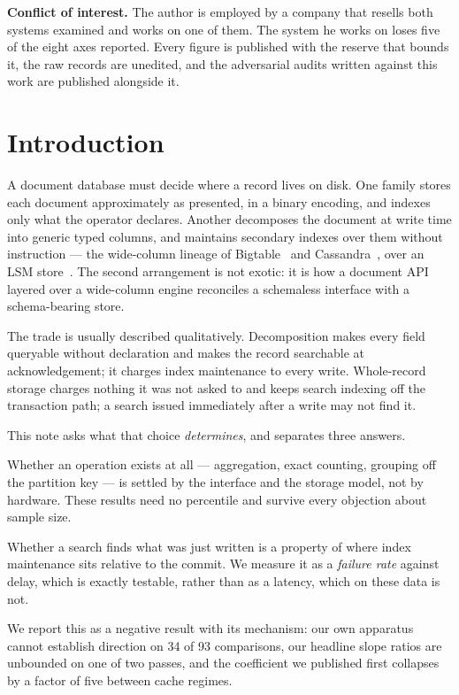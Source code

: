 \documentclass[11pt,a4paper]{article}
\begin{document}
\vspace{0.5em}
\noindent\textbf{Conflict of interest.} The author is employed by a company that resells both
systems examined and works on one of them. The system he works on loses five of the eight axes
reported. Every figure is published with the reserve that bounds it, the raw records are unedited,
and the adversarial audits written against this work are published alongside it.

\section{Introduction}

A document database must decide where a record lives on disk. One family stores each document
approximately as presented, in a binary encoding, and indexes only what the operator declares.
Another decomposes the document at write time into generic typed columns, and maintains secondary
indexes over them without instruction --- the wide-column lineage of Bigtable~\cite{chang2008bigtable}
and Cassandra~\cite{lakshman2010cassandra}, over an LSM store~\cite{oneil1996lsm,luo2019lsmsurvey}. The second arrangement is not exotic: it is how a document
API layered over a wide-column engine reconciles a schemaless interface with a schema-bearing store.

The trade is usually described qualitatively. Decomposition makes every field queryable without
declaration and makes the record searchable at acknowledgement; it charges index maintenance to
every write. Whole-record storage charges nothing it was not asked to and keeps search indexing off
the transaction path; a search issued immediately after a write may not find it.

This note asks what that choice \emph{determines}, and separates three answers.

\begin{description}[style=nextline]
\item[It determines capability.] Whether an operation exists at all --- aggregation, exact
counting, grouping off the partition key --- is settled by the interface and the storage model, not
by hardware. These results need no percentile and survive every objection about sample size.

\item[It determines index currency.] Whether a search finds what was just written is a property of
where index maintenance sits relative to the commit. We measure it as a \emph{failure rate} against
delay, which is exactly testable, rather than as a latency, which on these data is not.

\item[It does not determine latency, on evidence we can offer.] We report this as a negative
result with its mechanism: our own apparatus cannot establish direction on 34 of 93 comparisons,
our headline slope ratios are unbounded on one of two passes, and the coefficient we published
first collapses by a factor of five between cache regimes.
\end{description}
\end{document}
